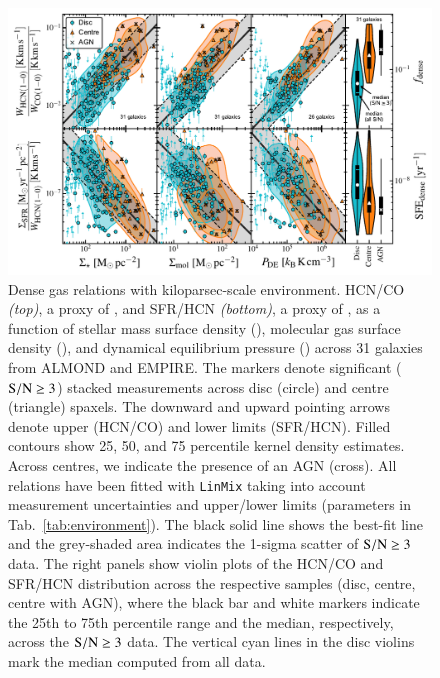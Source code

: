 \documentclass[letter, longauth]{aa} %
\begin{document}
\begin{figure}
\centering
\includegraphics[width=\textwidth]{Figures/HCN_scaling_relations_centre_vs_disc_compressed.pdf}
\caption{Dense gas relations with kiloparsec-scale environment. 
HCN/CO \textit{(top)}, a proxy of \fdense, and SFR/HCN \textit{(bottom)}, a proxy of \sfedense, as a function of stellar mass surface density (\sigstar), molecular gas surface density (\sigmol), and dynamical equilibrium pressure (\pde) across 31 galaxies from ALMOND and EMPIRE.
The markers denote significant ($\mathrm{S}/\mathrm{N}\geq 3$) stacked measurements across disc (circle) and centre (triangle) spaxels.
The downward and upward pointing arrows denote upper (HCN/CO) and lower limits (SFR/HCN).
Filled contours show 25, 50, and 75 percentile kernel density estimates.
Across centres, we indicate the presence of an AGN (cross).
All relations have been fitted with \texttt{LinMix} taking into account measurement uncertainties and upper/lower limits (parameters in Tab.~\ref{tab:environment}).
The black solid line shows the best-fit line and the grey-shaded area indicates the 1-sigma scatter of $\mathrm{S}/\mathrm{N}\geq 3$ data.
The right panels show violin plots of the HCN/CO and SFR/HCN distribution across the respective samples (disc, centre, centre with AGN), where the black bar and white markers indicate the 25th to 75th percentile range and the median, respectively, across the $\mathrm{S}/\mathrm{N}\geq 3$ data.
The vertical cyan lines in the disc violins mark the median computed from all \snr data.
}
\label{fig:hcn_scaling_relations}
\end{figure}

\end{document}
